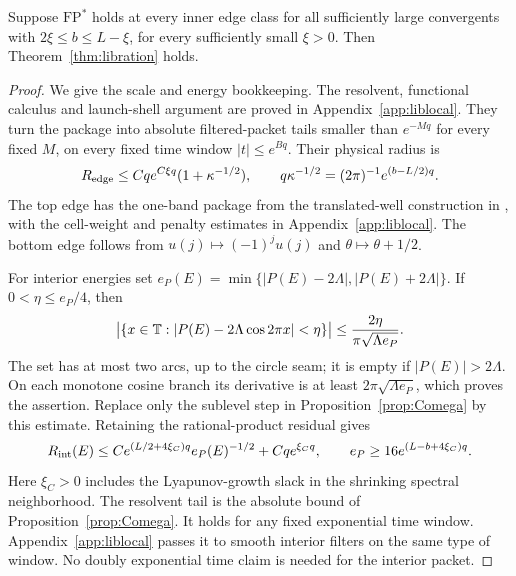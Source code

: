 \begin{proposition}\label{prop:FPtransport}
Suppose $\mathrm{FP}^*$ holds at every inner edge class for all
sufficiently large convergents with $2\xi\le b\le L-\xi$, for every
sufficiently small $\xi>0$. Then Theorem~\ref{thm:libration} holds.
\end{proposition}

\begin{proof}
We give the scale and energy bookkeeping. The resolvent, functional
calculus and launch-shell argument are proved in
Appendix~\ref{app:liblocal}. They turn the package into absolute
filtered-packet tails smaller than $e^{-Mq}$ for every fixed $M$,
on every fixed time window $|t|\le e^{Bq}$. Their physical radius is
\begin{equation}\label{eq:libedgeR}
 R_{\rm edge}\le Cq e^{C\xi q}(1+\kappa^{-1/2}),\qquad
 q\kappa^{-1/2}=(2\pi)^{-1}e^{(b-L/2)q}.
\end{equation}
The top edge has the one-band package from the translated-well
construction in \cite[Appendices C--E]{DMband}, with the
cell-weight and penalty estimates in
Appendix~\ref{app:liblocal}. The bottom edge follows from
$u(j)\mapsto(-1)^ju(j)$ and $\theta\mapsto\theta+1/2$.

For interior energies set
$e_P(E)=\min\{|P(E)-2\Lambda|,|P(E)+2\Lambda|\}$.
If $0<\eta\le e_P/4$, then
\begin{equation}\label{eq:libsublevel}
 \bigl|\{x\in\mathbb T:|P(E)-2\Lambda\cos2\pi x|<\eta\}\bigr|
 \le \frac{2\eta}{\pi\sqrt{\Lambda e_P}}.
\end{equation}
The set has at most two arcs, up to the circle seam; it is empty if
$|P(E)|>2\Lambda$. On each monotone cosine branch its derivative is
at least $2\pi\sqrt{\Lambda e_P}$, which proves the assertion.
Replace only the sublevel step in Proposition~\ref{prop:Comega} by
this estimate. Retaining the rational-product residual gives
\begin{equation}\label{eq:libinterior}
 R_{\rm int}(E)\le
 C e^{(L/2+4\xi_C)q}e_P(E)^{-1/2}+Cq e^{\xi_Cq},
 \qquad e_P\ge16e^{(L-b+4\xi_C)q}.
\end{equation}
Here $\xi_C>0$ includes the Lyapunov-growth slack in the shrinking
spectral neighborhood. The resolvent tail is the absolute bound
of Proposition~\ref{prop:Comega}. It holds for any fixed exponential
time window. Appendix~\ref{app:liblocal} passes it to smooth interior
filters on the same type of window. No doubly exponential time
claim is needed for the interior packet.


\end{proof}
